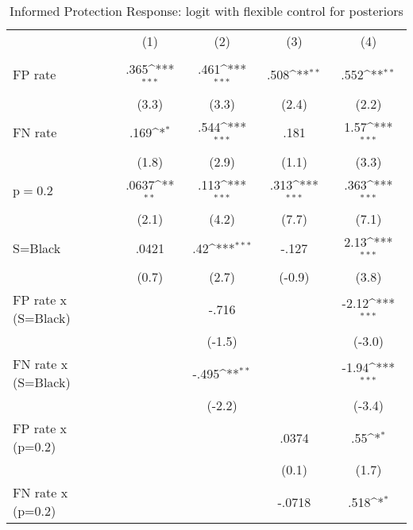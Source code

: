 \begin{table}[htbp]\centering
\def\sym#1{\ifmmode^{#1}\else\(^{#1}\)\fi}
\caption{Informed Protection Response: logit with flexible control for posteriors}
\begin{tabular}{l*{4}{c}}
\hline\hline
                &\multicolumn{1}{c}{(1)}&\multicolumn{1}{c}{(2)}&\multicolumn{1}{c}{(3)}&\multicolumn{1}{c}{(4)}\\
                &\multicolumn{1}{c}{}&\multicolumn{1}{c}{}&\multicolumn{1}{c}{}&\multicolumn{1}{c}{}\\
\hline
FP rate         &     .365\sym{***}&     .461\sym{***}&     .508\sym{**} &     .552\sym{**} \\
                &    (3.3)         &    (3.3)         &    (2.4)         &    (2.2)         \\
FN rate         &     .169\sym{*}  &     .544\sym{***}&     .181         &     1.57\sym{***}\\
                &    (1.8)         &    (2.9)         &    (1.1)         &    (3.3)         \\
p$=$0.2         &    .0637\sym{**} &     .113\sym{***}&     .313\sym{***}&     .363\sym{***}\\
                &    (2.1)         &    (4.2)         &    (7.7)         &    (7.1)         \\
S=Black         &    .0421         &      .42\sym{***}&    -.127         &     2.13\sym{***}\\
                &    (0.7)         &    (2.7)         &   (-0.9)         &    (3.8)         \\
FP rate x (S=Black)&                  &    -.716         &                  &    -2.12\sym{***}\\
                &                  &   (-1.5)         &                  &   (-3.0)         \\
FN rate x (S=Black)&                  &    -.495\sym{**} &                  &    -1.94\sym{***}\\
                &                  &   (-2.2)         &                  &   (-3.4)         \\
FP rate x (p=0.2)&                  &                  &    .0374         &      .55\sym{*}  \\
                &                  &                  &    (0.1)         &    (1.7)         \\
FN rate x (p=0.2)&                  &                  &   -.0718         &     .518\sym{*}  \\

\end{tabular}
\end{table}
